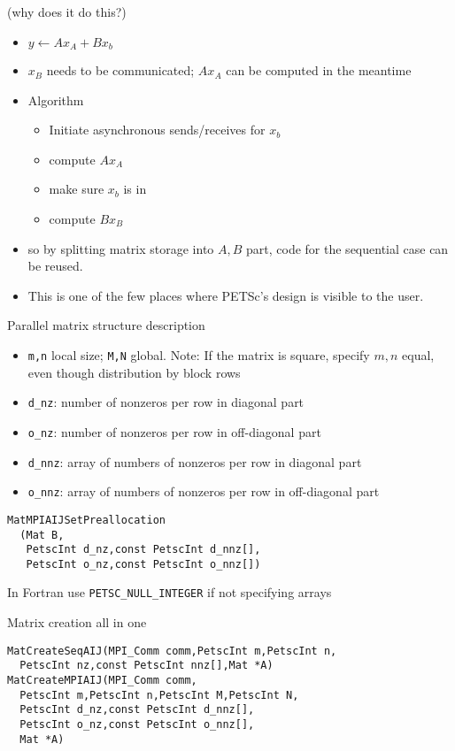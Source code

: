 \begin{numberedframe}{(why does it do this?)}
  \begin{itemize}
  \item $y\leftarrow Ax_A+Bx_b$
  \item $x_B$ needs to be communicated; $Ax_A$ can be computed in the
    meantime
  \item Algorithm
    \begin{itemize}
    \item Initiate asynchronous sends/receives for $x_b$
    \item compute $Ax_A$
    \item make sure $x_b$ is in
    \item compute $Bx_B$
    \end{itemize}
  \item so by splitting matrix storage into $A,B$ part, code for the
    sequential case can be reused.
  \item This is one of the few places where PETSc's design is visible to
    the user.
  \end{itemize}
\end{numberedframe}

\begin{numberedframe}{Parallel matrix structure description}
  \begin{itemize}
  \item \lstinline{m,n} local size; \lstinline{M,N} global. Note: If the matrix is
    square, specify $m,n$ equal, even though distribution by block rows
  \item \lstinline{d_nz}: number of nonzeros per row in diagonal part
  \item \lstinline{o_nz}: number of nonzeros per row in off-diagonal part
  \item \lstinline{d_nnz}: array of numbers of nonzeros per row in diagonal part
  \item \lstinline{o_nnz}: array of numbers of nonzeros per row in off-diagonal part
  \end{itemize}
\begin{lstlisting}
MatMPIAIJSetPreallocation
  (Mat B,
   PetscInt d_nz,const PetscInt d_nnz[],
   PetscInt o_nz,const PetscInt o_nnz[])
\end{lstlisting}

In Fortran use \lstinline{PETSC_NULL_INTEGER} if not specifying arrays
\end{numberedframe}

\begin{details}
\begin{numberedframe}{Matrix creation all in one}
\begin{lstlisting}
MatCreateSeqAIJ(MPI_Comm comm,PetscInt m,PetscInt n,
  PetscInt nz,const PetscInt nnz[],Mat *A)
MatCreateMPIAIJ(MPI_Comm comm,
  PetscInt m,PetscInt n,PetscInt M,PetscInt N,
  PetscInt d_nz,const PetscInt d_nnz[],
  PetscInt o_nz,const PetscInt o_nnz[],
  Mat *A)
\end{lstlisting}
\end{numberedframe}

\end{details}

